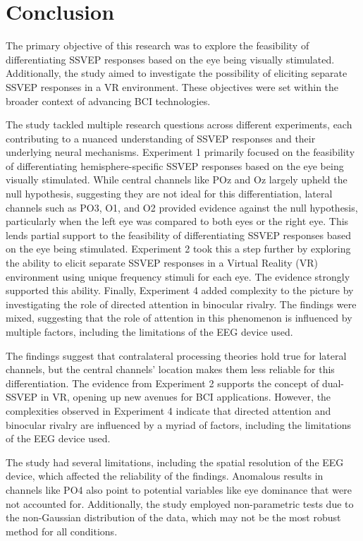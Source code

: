 \chapter{Conclusion}\label{cha:conclusion}

The primary objective of this research was to explore the feasibility of differentiating SSVEP responses based on the eye being visually stimulated. Additionally, the study aimed to investigate the possibility of eliciting separate SSVEP responses in a VR environment. These objectives were set within the broader context of advancing BCI technologies.

The study tackled multiple research questions across different experiments, each contributing to a nuanced understanding of SSVEP responses and their underlying neural mechanisms. Experiment 1 primarily focused on the feasibility of differentiating hemisphere-specific SSVEP responses based on the eye being visually stimulated. While central channels like POz and Oz largely upheld the null hypothesis, suggesting they are not ideal for this differentiation, lateral channels such as PO3, O1, and O2 provided evidence against the null hypothesis, particularly when the left eye was compared to both eyes or the right eye. This lends partial support to the feasibility of differentiating SSVEP responses based on the eye being stimulated. Experiment 2 took this a step further by exploring the ability to elicit separate SSVEP responses in a Virtual Reality (VR) environment using unique frequency stimuli for each eye. The evidence strongly supported this ability. Finally, Experiment 4 added complexity to the picture by investigating the role of directed attention in binocular rivalry. The findings were mixed, suggesting that the role of attention in this phenomenon is influenced by multiple factors, including the limitations of the EEG device used.

The findings suggest that contralateral processing theories hold true for lateral channels, but the central channels' location makes them less reliable for this differentiation. The evidence from Experiment 2 supports the concept of dual-SSVEP in VR, opening up new avenues for BCI applications. However, the complexities observed in Experiment 4 indicate that directed attention and binocular rivalry are influenced by a myriad of factors, including the limitations of the EEG device used.

The study had several limitations, including the spatial resolution of the EEG device, which affected the reliability of the findings. Anomalous results in channels like PO4 also point to potential variables like eye dominance that were not accounted for. Additionally, the study employed non-parametric tests due to the non-Gaussian distribution of the data, which may not be the most robust method for all conditions.

